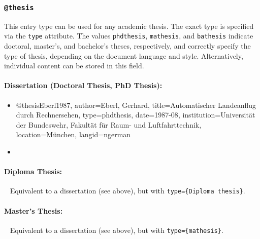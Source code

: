 
\subsubsection{\texttt{\bfseries @thesis}}
\label{sec:@thesis}

This entry type can be used for any academic thesis. The exact type is specified via the
\texttt{type} attribute. The values \texttt{phdthesis}, \texttt{mathesis}, and
\texttt{bathesis} indicate doctoral, master's, and bachelor's theses,
respectively, and correctly specify the type of thesis, depending on the
document language and style. Alternatively, individual content can be stored in
this field.

\paragraph{Dissertation (Doctoral Thesis, PhD Thesis):}
%
\begin{itemize}
\item[]
\begin{GenericCode}[numbers=none]
@thesis{Eberl1987,
  author={Eberl, Gerhard},
  title={Automatischer Landeanflug durch Rechnersehen},
  type={phdthesis},
  date={1987-08},
  institution={Universität der Bundeswehr, Fakultät für Raum- und Luftfahrttechnik},
  location={München},
  langid={ngerman}
}
\end{GenericCode}
\item[\cite{Eberl1987}] 
\end{itemize}

\paragraph{Diploma Thesis:} ~ \newline
Equivalent to a dissertation (see above), but with
\texttt{type=\obnh\{Diploma thesis\}}.


\paragraph{Master's Thesis:} ~ \newline
Equivalent to a dissertation (see above), but with \texttt{type=\{mathesis\}}.%

